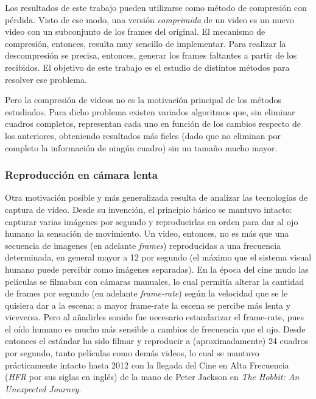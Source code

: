 Los resultados de este trabajo pueden utilizarse como método de compresión con pérdida. Visto de ese modo, una versión \emph{comprimida} de un video es un nuevo video con un subconjunto de los frames del original. El mecanismo de compresión, entonces, resulta muy sencillo de implementar. Para realizar la descompresión se precisa, entonces, generar los frames faltantes a partir de los recibidos. El objetivo de este trabajo es el estudio de distintos métodos para resolver ese problema.

Pero la compresión de videos no es la motivación principal de los métodos estudiados. Para dicho problema existen variados algoritmos que, sin eliminar cuadros completos, representan cada uno en función de los cambios respecto de los anteriores, obteniendo resultados más fieles (dado que no eliminan por completo la información de ningún cuadro) sin un tamaño mucho mayor\cite{wiki_data_compression_video}.

\subsubsection{Reproducción en cámara lenta}
Otra motivación posible y más generalizada resulta de analizar las tecnologías de captura de video. Desde su invención, el principio básico se mantuvo intacto: capturar varias imágenes por segundo y reproducirlas en orden para dar al ojo humano la sensación de movimiento. Un video, entonces, no es más que una secuencia de imagenes (en adelante \emph{frames}) reproducidas a una frecuencia determinada, en general mayor a 12 por segundo (el máximo que el sistema visual humano puede percibir como imágenes separadas\cite{wiki_framerate}). En la época del cine mudo las películas se filmaban con cámaras manuales, lo cual permitía alterar la cantidad de frames por segundo (en adelante \emph{frame-rate}) según la velocidad que se le quisiera dar a la escena: a mayor frame-rate la escena se percibe más lenta y viceversa. Pero al añadirles sonido fue necesario estandarizar el frame-rate, pues el oído humano es mucho más sensible a cambios de frecuencia que el ojo\cite{wiki_framerate}. Desde entonces el estándar ha sido filmar y reproducir a (aproximadamente) 24 cuadros por segundo, tanto películas como demás videos, lo cual se mantuvo prácticamente intacto hasta 2012 con la llegada del Cine en Alta Frecuencia (\emph{HFR} por sus siglas en inglés) de la mano de Peter Jackson en \emph{The Hobbit: An Unexpected Journey}.

